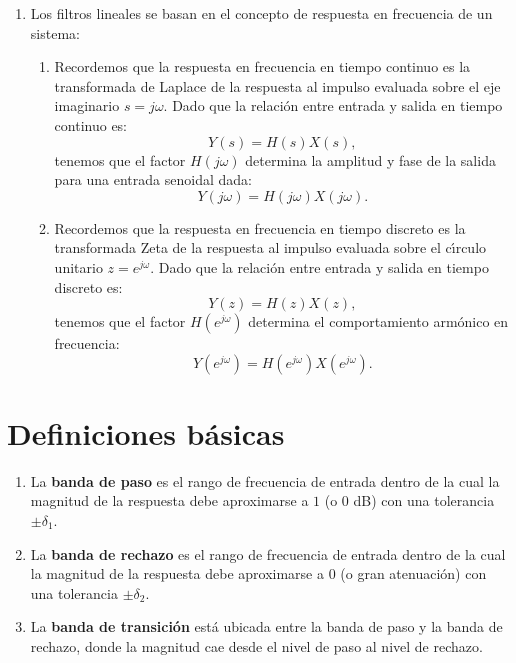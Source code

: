 \documentclass[11pt,a4paper,openany]{book}
\begin{document}
\begin{enumerate}
	\item Los filtros lineales se basan en el concepto de respuesta en frecuencia de un sistema: 
	\begin{enumerate}
		\item Recordemos que la respuesta en frecuencia en tiempo continuo es la transformada de Laplace de la respuesta al impulso evaluada sobre el eje imaginario $s = j \omega$. Dado que la relaci\'{o}n entre entrada y salida en tiempo continuo es:
		\begin{equation}
			Y(s) = H(s) X(s),
		\end{equation}
		tenemos que el factor $H( j \omega)$ determina la amplitud y fase de la salida para una entrada senoidal dada:
		\begin{equation}
			Y(j \omega) = H(j \omega) X(j \omega).
		\end{equation}
		
		\item Recordemos que la respuesta en frecuencia en tiempo discreto es la transformada Zeta de la respuesta al impulso evaluada sobre el c\'{\i}rculo unitario $z = e^{j \omega}$. Dado que la relaci\'{o}n entre entrada y salida en tiempo discreto es:
		\begin{equation}
			Y(z) = H(z) X(z),
		\end{equation}
		tenemos que el factor $H(e^{j \omega})$ determina el comportamiento armónico en frecuencia:
		\begin{equation}
			Y(e^{j \omega}) = H(e^{j \omega}) X(e^{j \omega}).
		\end{equation}
	\end{enumerate}
	
\end{enumerate}

\section{Definiciones b\'{a}sicas}

\begin{enumerate}
	\item La \textbf{banda de paso} es el rango de frecuencia de entrada dentro de la cual la magnitud de la respuesta debe aproximarse a $1$ (o $0$ dB) con una tolerancia $\pm \delta _{1}.$
	\item La \textbf{banda de rechazo} es el rango de frecuencia de entrada dentro de la cual la magnitud de la respuesta debe aproximarse a $0$ (o gran atenuación) con una tolerancia $\pm \delta _{2}.$
	\item La \textbf{banda de transici\'{o}n} est\'{a} ubicada entre la banda de paso y la banda de rechazo, donde la magnitud cae desde el nivel de paso al nivel de rechazo.
\end{enumerate}
\end{document}
